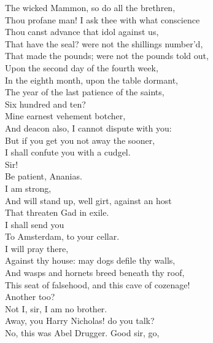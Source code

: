 \documentclass[a4paper,oneside]{memoir}
\begin{document}
\begin{drama*}
The wicked Mammon, so do all the brethren,\\
Thou profane man! I ask thee with what conscience\\
Thou canst advance that idol against us,\\
That have the seal? were not the shillings number'd,\\
That made the pounds; were not the pounds told out,\\
Upon the second day of the fourth week,\\
In the eighth month, upon the table dormant,\\
The year of the last patience of the saints,\\
Six hundred and ten?\\
\lovewitspeaks {} Mine earnest vehement botcher,\\
And deacon also, I cannot dispute with you:\\
But if you get you not away the sooner,\\
I shall confute you with a cudgel.\\
\ananiasspeaks {} Sir!\\
\tribulationspeaks Be patient, Ananias.\\
\ananiasspeaks {} I am strong,\\
And will stand up, well girt, against an host\\
That threaten Gad in exile.\\
\lovewitspeaks {} I shall send you\\
To Amsterdam, to your cellar.\\
\ananiasspeaks {} I will pray there,\\
Against thy house: may dogs defile thy walls,\\
And wasps and hornets breed beneath thy roof,\\
This seat of falsehood, and this cave of cozenage!\\
\lovewitspeaks Another too?\\
\druggerspeaks {} Not I, sir, I am no brother.\\
\lovewitspeaks {} Away, you Harry Nicholas! do you talk?\\
\facespeaks No, this was Abel Drugger. Good sir, go,\\

\end{drama*}
\end{document}
